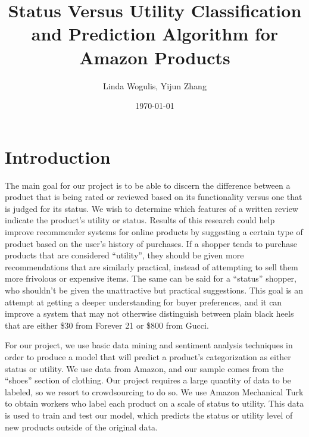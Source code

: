 \documentclass[dvips,12pt]{article}
\begin{document}

\title{\textbf{Status Versus Utility Classification and Prediction Algorithm for Amazon Products}}
\author{Linda Wogulis, Yijun Zhang}
\date{\today}



\maketitle


\section{Introduction}


The main goal for our project is to be able to discern the difference between a product that is being rated or reviewed based on its functionality versus one that is judged for its status. We wish to determine which features of a written review indicate the product’s utility or status. Results of this research could help improve recommender systems for online products by suggesting a certain type of product based on the user’s history of purchases. If a shopper tends to purchase products that are considered “utility”, they should be given more recommendations that are similarly practical, instead of attempting to sell them more frivolous or expensive items. The same can be said for a “status” shopper, who shouldn’t be given the unattractive but practical suggestions. This goal is an attempt at getting a deeper understanding for buyer preferences, and it can improve a system that may not otherwise distinguish between plain black heels that are either \$30 from Forever 21 or \$800 from Gucci.

For our project, we use basic data mining and sentiment analysis techniques in order to produce a model that will predict a product’s categorization as either status or utility. We use data from Amazon, and our sample comes from the “shoes” section of clothing. Our project requires a large quantity of data to be labeled, so we resort to crowdsourcing to do so. We use Amazon Mechanical Turk to obtain workers who label each product on a scale of status to utility. This data is used to train and test our model, which predicts the status or utility level of new products outside of the original data. 
\end{document}
